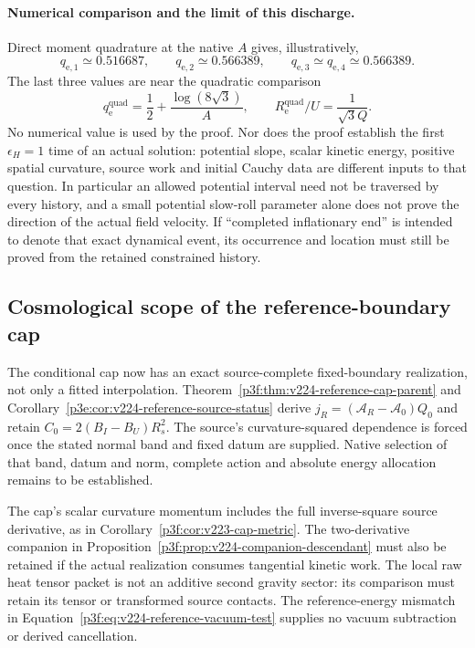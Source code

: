 \documentclass[12pt,a4paper]{article}
\begin{document}
\paragraph{Numerical comparison and the limit of this discharge.}
Direct moment quadrature at the native \(A\) gives, illustratively,
\[
 q_{\mathrm e,1}\simeq0.516687,\qquad
 q_{\mathrm e,2}\simeq0.566389,\qquad
 q_{\mathrm e,3}\simeq q_{\mathrm e,4}\simeq0.566389.
\]
The last three values are near the quadratic comparison
\[
 q_{\mathrm e}^{\mathrm{quad}}
      =\frac12+\frac{\log(8\sqrt3)}A,
 \qquad R_{\mathrm e}^{\mathrm{quad}}/U=\frac1{\sqrt3Q}.
\]
No numerical value is used by the proof.  Nor does the proof establish
the first \(\epsilon_H=1\) time of an actual solution: potential slope,
scalar kinetic energy, positive spatial curvature, source work and
initial Cauchy data are different inputs to that question.  In particular
an allowed potential interval need not be traversed by every history,
and a small potential slow-roll parameter alone does not prove the
direction of the actual field velocity.  If ``completed inflationary
end'' is intended to denote that exact dynamical event, its occurrence
and location must still be proved from the retained constrained history.

\subsection{Cosmological scope of the reference-boundary cap}
\label{p6a:sec:v224-cap-source-scope}
The conditional cap now has an exact source-complete fixed-boundary
realization, not only a fitted interpolation. Theorem~\ref{p3f:thm:v224-reference-cap-parent}
and Corollary~\ref{p3e:cor:v224-reference-source-status} derive
$j_R=(\mathcal A_R-\mathcal A_0)Q_0$ and retain
$C_0=2(B_I-B_U)R_s^2$. The source's curvature-squared dependence is
forced once the stated normal band and fixed datum are supplied.
Native selection of that band, datum and norm, complete action and
absolute energy allocation remains to be established.

The cap's scalar curvature momentum includes the full inverse-square
source derivative, as in Corollary~\ref{p3f:cor:v223-cap-metric}.
The two-derivative companion in
Proposition~\ref{p3f:prop:v224-companion-descendant} must also be
retained if the actual realization consumes tangential kinetic work.
The local raw heat tensor packet is not an additive second gravity
sector: its comparison must retain its tensor or transformed source
contacts. The reference-energy mismatch in
Equation~\eqref{p3f:eq:v224-reference-vacuum-test} supplies no vacuum
subtraction or derived cancellation.
\end{document}
